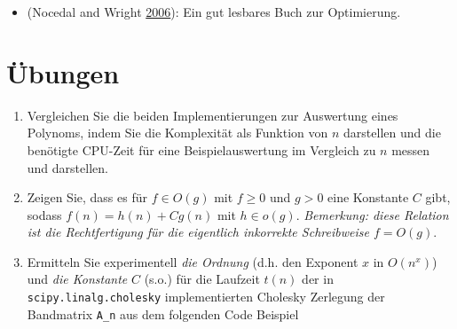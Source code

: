 \documentclass[
]{book}
\providecommand{\tightlist}{%
  \setlength{\itemsep}{0pt}\setlength{\parskip}{0pt}}
\theoremstyle{definition}
\theoremstyle{definition}
\theoremstyle{definition}
\theoremstyle{definition}
\theoremstyle{remark}
\begin{document}
\begin{itemize}
\tightlist
\item
  (Nocedal and Wright \protect\hyperlink{ref-NocW06}{2006}): Ein gut lesbares Buch zur Optimierung.
\end{itemize}

\hypertarget{uxfcbungen}{%
\section{Übungen}\label{uxfcbungen}}

\begin{enumerate}
\def\labelenumi{\arabic{enumi}.}
\item
  Vergleichen Sie die beiden Implementierungen zur Auswertung eines Polynoms, indem Sie die Komplexität als Funktion von \(n\) darstellen und die benötigte CPU-Zeit für eine Beispielauswertung im Vergleich zu \(n\) messen und darstellen.
\item
  Zeigen Sie, dass es für \(f\in O(g)\) mit \(f\geq 0\) und \(g> 0\) eine Konstante \(C\) gibt, sodass \(f(n)=h(n) + Cg(n)\) mit \(h\in o(g)\). \emph{Bemerkung: diese Relation ist die Rechtfertigung für die eigentlich inkorrekte Schreibweise \(f=O(g)\)}.
\item
  Ermitteln Sie experimentell \emph{die Ordnung} (d.h. den Exponent \(x\) in \(O(n^x)\)) und \emph{die Konstante} \(C\) (s.o.) für die Laufzeit \(t(n)\) der in \texttt{scipy.linalg.cholesky} implementierten Cholesky Zerlegung der Bandmatrix \texttt{A\_n} aus dem folgenden Code Beispiel
\end{enumerate}
\end{document}

